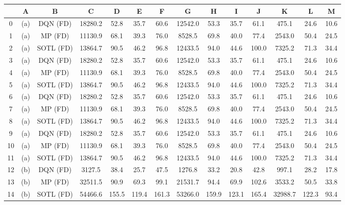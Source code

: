 \begin{table}[htbp]
\centering
\small
\setlength\tabcolsep{2pt}
\begin{tabular}{|c|c|c|c|c|c|c|c|c|c|c|c|c|c|}
\hline
{} &    A &          B &       C &     D &     E &     F &       G &     H &     I &     J &       K &     L &    M \\
\hline
0  &  (a) &   DQN (FD) & 18280.2 &  52.8 &  35.7 &  60.6 & 12542.0 &  53.3 &  35.7 &  61.1 &   475.1 &  24.6 & 10.6 \\
1  &  (a) &    MP (FD) & 11130.9 &  68.1 &  39.3 &  76.0 &  8528.5 &  69.8 &  40.0 &  77.4 &  2543.0 &  50.4 & 24.5 \\
2  &  (a) &  SOTL (FD) & 13864.7 &  90.5 &  46.2 &  96.8 & 12433.5 &  94.0 &  44.6 & 100.0 &  7325.2 &  71.3 & 34.4 \\
3  &  (a) &   DQN (FD) & 18280.2 &  52.8 &  35.7 &  60.6 & 12542.0 &  53.3 &  35.7 &  61.1 &   475.1 &  24.6 & 10.6 \\
4  &  (a) &    MP (FD) & 11130.9 &  68.1 &  39.3 &  76.0 &  8528.5 &  69.8 &  40.0 &  77.4 &  2543.0 &  50.4 & 24.5 \\
5  &  (a) &  SOTL (FD) & 13864.7 &  90.5 &  46.2 &  96.8 & 12433.5 &  94.0 &  44.6 & 100.0 &  7325.2 &  71.3 & 34.4 \\
6  &  (a) &   DQN (FD) & 18280.2 &  52.8 &  35.7 &  60.6 & 12542.0 &  53.3 &  35.7 &  61.1 &   475.1 &  24.6 & 10.6 \\
7  &  (a) &    MP (FD) & 11130.9 &  68.1 &  39.3 &  76.0 &  8528.5 &  69.8 &  40.0 &  77.4 &  2543.0 &  50.4 & 24.5 \\
8  &  (a) &  SOTL (FD) & 13864.7 &  90.5 &  46.2 &  96.8 & 12433.5 &  94.0 &  44.6 & 100.0 &  7325.2 &  71.3 & 34.4 \\
9  &  (a) &   DQN (FD) & 18280.2 &  52.8 &  35.7 &  60.6 & 12542.0 &  53.3 &  35.7 &  61.1 &   475.1 &  24.6 & 10.6 \\
10 &  (a) &    MP (FD) & 11130.9 &  68.1 &  39.3 &  76.0 &  8528.5 &  69.8 &  40.0 &  77.4 &  2543.0 &  50.4 & 24.5 \\
11 &  (a) &  SOTL (FD) & 13864.7 &  90.5 &  46.2 &  96.8 & 12433.5 &  94.0 &  44.6 & 100.0 &  7325.2 &  71.3 & 34.4 \\
12 &  (b) &   DQN (FD) &  3127.5 &  38.4 &  25.7 &  47.5 &  1276.8 &  33.2 &  20.8 &  42.8 &   997.1 &  28.2 & 17.8 \\
13 &  (b) &    MP (FD) & 32511.5 &  90.9 &  69.3 &  99.1 & 21531.7 &  94.4 &  69.9 & 102.6 &  3533.2 &  50.5 & 33.8 \\
14 &  (b) &  SOTL (FD) & 54466.6 & 155.5 & 119.4 & 161.3 & 53266.0 & 159.9 & 123.1 & 165.4 & 32988.7 & 122.3 & 93.4 \\

\end{tabular}
\end{table}
